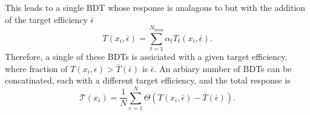This leads to a single BDT whose response is analagous to  but with the addition
of the target efficiency $\bar\epsilon$
\begin{equation}
  T(x_i,\bar\epsilon) = \sum_{t=1}^{N_\mathrm{trees}} \alpha_tT_t(x_i,\bar\epsilon).
  \label{eq:ada:fullbdt}
\end{equation}
Therefore, a single of these BDTs is assiciated with a given target efficiency, where
fraction of $T(x_i,\epsilon)>\bar T(\bar\epsilon)$ is $\bar\epsilon$.
An arbiary number of BDTs can be concatinated, each with a different target efficiency, and the
total response is
\begin{equation}
  \mathcal{T}(x_i) =
  \frac1N\sum_{e=1}^{N}\Theta\left(T(x_i, \bar\epsilon) - \bar T(\bar\epsilon)\right).
\end{equation}








%
















